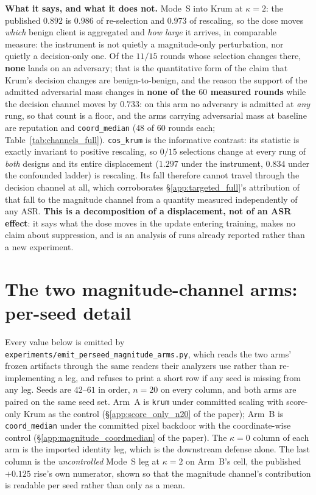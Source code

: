 \documentclass{article}
\begin{document}
\noindent \textbf{What it says, and what it does not.} Mode~S into Krum at $\kappa{=}2$: the published $0.892$ is $0.986$ of re-selection and $0.973$ of rescaling, so the dose moves \emph{which} benign client is aggregated and \emph{how large} it arrives, in comparable measure: the instrument is not quietly a magnitude-only perturbation, nor quietly a decision-only one. Of the $11/15$ rounds whose selection changes there, \textbf{none} lands on an adversary; that is the quantitative form of the claim that Krum's decision changes are benign-to-benign, and the reason the support of the admitted adversarial mass changes in \textbf{none of the $60$ measured rounds} while the decision channel moves by $0.733$: on this arm no adversary is admitted at \emph{any} rung, so that count is a floor, and the arms carrying adversarial mass at baseline are reputation and \texttt{coord\_median} ($48$ of $60$ rounds each; Table~\ref{tab:channels_full}). \texttt{cos\_krum} is the informative contrast: its statistic is exactly invariant to positive rescaling, so $0/15$ selections change at every rung of \emph{both} designs and its entire displacement ($1.297$ under the instrument, $0.834$ under the confounded ladder) is rescaling. Its fall therefore cannot travel through the decision channel at all, which corroborates §\ref{app:targeted_full}'s attribution of that fall to the magnitude channel from a quantity measured independently of any ASR. \textbf{This is a decomposition of a displacement, not of an ASR effect}: it says what the dose moves in the update entering training, makes no claim about suppression, and is an analysis of runs already reported rather than a new experiment.

\section{The two magnitude-channel arms: per-seed detail}
\label{app:magnitude_perseed}

Every value below is emitted by \texttt{experiments/\allowbreak emit\_perseed\_magnitude\_arms.py},
which reads the two arms' frozen artifacts through the same readers their analyzers use rather than
re-implementing a leg, and refuses to print a short row if any seed is missing from any leg. Seeds are
$42$--$61$ in order, $n{=}20$ on every column, and both arms are paired on the same seed set.
Arm~A is \texttt{krum} under committed scaling with score-only Krum as the control
(\S\ref{app:score_only_n20} of the paper); Arm~B is \texttt{coord\_median} under the committed pixel
backdoor with the coordinate-wise control (\S\ref{app:magnitude_coordmedian} of the paper). The
$\kappa{=}0$ column of each arm is the imported identity leg, which is the downstream defense alone.
The last column is the \emph{uncontrolled} Mode~S leg at $\kappa{=}2$ on Arm~B's cell, the published
$+0.125$ rise's own numerator, shown so that the magnitude channel's contribution is readable per seed
rather than only as a mean.
\end{document}
